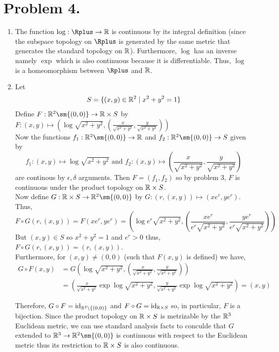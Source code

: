 \documentclass[12pt]{extarticle}
\begin{document}
\section*{Problem 4.}
\begin{enumerate}
\item The function $\log : \Rplus \rightarrow \R$ is continuous by its integral definition (since the subspace topology on $\Rplus$ is generated by the same metric that generates the standard topology on $\mathbb{R}$). Furthermore, $\log$ has an inverse namely $\exp$ which is also continuous because it is differentiable. Thus, $\log$ is a homeomorphism between $\Rplus$ and $\mathbb{R}$. 

\item  Let \[S = \{(x, y) \in \mathbb{R}^2 \mid x^2 + y^2 = 1\}\]
Define $F : \R^2 \sm \{(0,0)\} \rightarrow \R \times S$ by $F : (x, y) \mapsto \left(\log{\sqrt{x^2 + y^2}}, \left(\frac{x}{\sqrt{x^2 + y^2}}, \frac{y}{\sqrt{x^2 + y^2}} \right) \right)$ \\

Now the functions $f_1 : \R^2 \sm \{(0,0)\} \rightarrow \R$ and $f_2 : \R^2 \sm \{(0,0)\} \rightarrow S$ given by \[f_1 : (x, y) \mapsto \log{\sqrt{x^2+y^2}} \text{ and } f_2 : (x,y) \mapsto \left(\frac{x}{\sqrt{x^2 + y^2}}, \frac{y}{\sqrt{x^2 + y^2}} \right)\] are continous by $\epsilon, \delta$ arguments. Then $F = (f_1, f_2)$ so by problem 3, $F$ is continuous under the product topology on $\mathbb{R} \times S$. \bigskip \\ Now define $G : \R \times S \rightarrow \R^2 \sm \{(0,0)\}$ by $G : (r, (x, y)) \mapsto (x e^r, y e^r)$. Thus, \[F \circ G(r, (x, y)) = F(x e^r, y e^r) = \left(\log{e^r \sqrt{x^2 + y^2}}, \left(\frac{x e^r}{e^r \sqrt{x^2 + y^2}}, \frac{y e^r}{e^r \sqrt{x^2 + y^2}} \right) \right)\]
But $(x, y) \in S$ so $x^2 + y^2 = 1$ and $e^r > 0$ thus, $F \circ G(r, (x, y)) = (r, (x, y))$. \\
Furthermore, for $(x,y) \neq (0,0)$ (such that $F(x,y)$ is defined) we have,
\begin{align*}
G \circ F(x, y) &= G \left(\log{\sqrt{x^2 + y^2}}, \left(\frac{x}{\sqrt{x^2 + y^2}}, \frac{y}{\sqrt{x^2 + y^2}} \right) \right) \\ &= \left(\frac{x}{\sqrt{x^2 + y^2}} \exp{\log{\sqrt{x^2 + y^2}}}, \frac{y}{\sqrt{x^2 + y^2}} \exp{\log{\sqrt{x^2 + y^2}}}  \right)  = (x, y)
\end{align*}

Therefore, $G \circ F = \mathrm{id}_{\mathbb{R}^2 \setminus \{(0,0)\}}$ and $F \circ G = \mathrm{id}_{\mathbb{R} \times S}$ so, in particular, $F$ is a bijection. Since the product topology on $\mathbb{R} \times S$ is metrizable by the $\mathbb{R}^3$ Euclidean metric, we can use standard analysis facts to conculde that $G$ extended to $\R^3 \rightarrow \R^2 \sm \{(0,0)\}$ is continuous with respect to the Euclidean metric thus its restriction to $\mathbb{R} \times S$ is also continuous.    

\end{enumerate}
\end{document}
